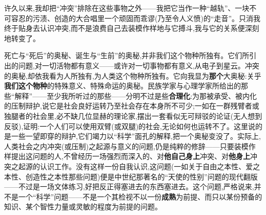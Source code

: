 许久以来,我却把“冲突”排除在这些事物之外——我把它当作一种“越轨”、一块不可容忍的污渍、创造的大合唱里一个顽固而乖谬(乃至令人义愤)的“走音”。只消我终于贴身去认识冲突,而不是浪费自己去装模作样地与它搏斗,我与它的关系便深刻地转变了。

死亡与“死后”的奥秘、诞生与“生前”的奥秘,并非我们这个物种所独有。它们所引出的问题,对一切活物都有意义——或许对一切事物都有意义,从电子到星云。冲突的奥秘,却依我看为人所独有,为人类这个物种所独有。它向我显为\textbf{那个}大奥秘:关乎\textbf{我们这个物种}的特殊意义、特殊命运的奥秘。民族学家与心理学家所给出的那些“解释”\dmark{}——至少我所听过的那些——分明不过是些\textbf{合理化}:为那被承受、被内化的压制辩护,说它是社会良好运转乃至社会存在本身所不可少;一如在一群残臂者或独腿者的社会里,必不缺几位显赫的理论家,摆出一套看似无可辩驳的论证(无人想到反驳),证明:一个人们可以使用双臂(或双腿)的社会,无论如何也运转不了。这里说的是一些一望即穿的辩护,它们竭力以“科学”面孔的解释,把一个奥秘变没了。实际上,人类社会之内冲突(或压制)之起源与意义的问题,仍是纯粹的修辞——只要装模作样提出这问题的人,不曾经历一场强烈而深入的、对\textbf{他自己身上}冲突、对\textbf{他身上}冲突之起源的认识工作。没有这样一份自我认识,这问题(一如关于自由之本性、爱之本性、创造性之本性那些问题)便是中世纪那著名的“天使的性别”问题的现代翻版——不过是一场文体练习,好把反正得塞进去的东西塞进去。这个问题,严格说来,并不是一个“科学”问题——不是一个其检视不以一份\textbf{成熟}为前提、而只以某份预备的知识、某个智性力量或灵敏的程度为前提的问题。

